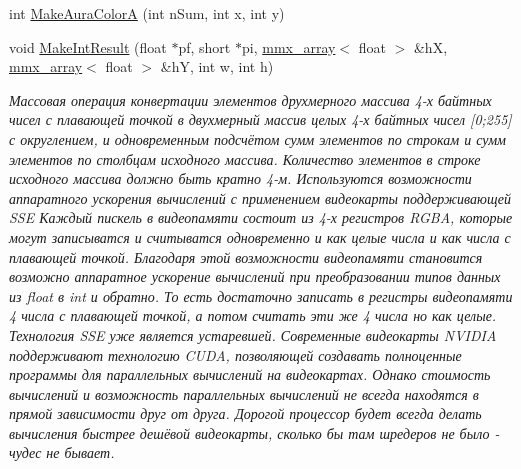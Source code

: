 \begin{DoxyCompactItemize}
\item 
int \hyperlink{class_c_v_i_engine_thread_a5c5e1e4c1a32d38b39af4547ed4b5827}{Make\+Aura\+Color\+A} (int n\+Sum, int x, int y)
\item 
void \hyperlink{class_c_v_i_engine_thread_a77e3066544a8804d4cc5250ac9f4c54b}{Make\+Int\+Result} (float $\ast$pf, short $\ast$pi, \hyperlink{classmmx__array}{mmx\+\_\+array}$<$ float $>$ \&h\+X, \hyperlink{classmmx__array}{mmx\+\_\+array}$<$ float $>$ \&h\+Y, int w, int h)
\begin{DoxyCompactList}\small\item\em Массовая операция конвертации элементов друхмерного массива 4-\/х байтных чисел с плавающей точкой в двухмерный массив целых 4-\/х байтных чисел \mbox{[}0;255\mbox{]} с округлением, и одновременным подсчётом сумм элементов по строкам и сумм элементов по столбцам исходного массива. Количество элементов в строке исходного массива должно быть кратно 4-\/м. Используются возможности аппаратного ускорения вычислений с применением видеокарты поддерживающей S\+S\+E Каждый пискель в видеопамяти состоит из 4-\/х регистров R\+G\+B\+A, которые могут записыватся и считыватся одновременно и как целые числа и как числа с плавающей точкой. Благодаря этой возможности видеопамяти становится возможно аппаратное ускорение вычислений при преобразовании типов данных из float в int и обратно. То есть достаточно записать в регистры видеопамяти 4 числа с плавающей точкой, а потом считать эти же 4 числа но как целые. Технология S\+S\+E уже является устаревшей. Современные видеокарты N\+V\+I\+D\+I\+A поддерживают технологию C\+U\+D\+A, позволяющей создавать полноценные программы для параллельных вычислений на видеокартах. Однако стоимость вычислений и возможность параллельных вычислений не всегда находятся в прямой зависимости друг от друга. Дорогой процессор будет всегда делать вычисления быстрее дешёвой видеокарты, сколько бы там шредеров не было -\/ чудес не бывает. \end{DoxyCompactList}\end{DoxyCompactItemize}
